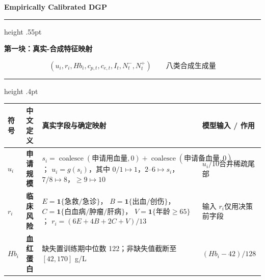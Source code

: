 \documentclass[a4paper,fontset=none]{ctexart}
\newcommand{\pagetitle}[1]{%
  \begin{center}
    {\fontsize{19}{22}\selectfont\bfseries Empirically Calibrated DGP}\par
  \end{center}
  \vspace{4pt}
  \color{rule}\hrule height .55pt\color{ink}
  \vspace{5pt}
  \noindent\colorbox{soft}{%
    \parbox{\dimexpr\linewidth-2\fboxsep\relax}{%
      \fontsize{13}{15}\selectfont\bfseries #1}}
  \vspace{5pt}}
\newcommand{\group}[1]{%
  \vspace{4pt}{\fontsize{11}{13}\selectfont\bfseries #1}\par
  \vspace{1pt}\color{rule}\hrule height .4pt\color{ink}\vspace{3pt}}
\begin{document}
\fontsize{9.4}{11.5}\selectfont

\pagetitle{第一块：真实-合成特征映射}

\[
\boxed{(u_i,r_i,Hb_i,c_{p,t},c_{e,t},I_t,N_t^-,N_t^+)}
\qquad\text{八类合成生成量}
\]

\group{患者特征}
\begin{center}
\fontsize{8.9}{10.7}\selectfont
\setlength{\tabcolsep}{4pt}
\begin{tabularx}{.99\textwidth}{
  >{\centering\arraybackslash}p{15mm}
  >{\raggedright\arraybackslash}p{25mm}
  >{\raggedright\arraybackslash}p{92mm}
  X}
\toprule
符号 & 中文定义 & 真实字段与确定映射 & 模型输入 / 作用\\
\midrule
$u_i$ & \textbf{申请规模} &
$s_i=\operatorname{coalesce}(\text{申请用血量},0)+
\operatorname{coalesce}(\text{申请备血量},0)$；\newline
$u_i=g(s_i)$，其中
$0/1\mapsto1$，$2$--$6\mapsto s_i$，$7/8\mapsto8$，$\ge9\mapsto10$ &
$u_i/10$\newline 合并稀疏尾部\\

$r_i$ & \textbf{临床风险} &
$E=\mathbf1\{\text{急救/急诊}\}$，
$B=\mathbf1\{\text{出血/创伤}\}$，\newline
$C=\mathbf1\{\text{白血病/肿瘤/肝病}\}$，
$V=\mathbf1\{\text{年龄}\ge65\}$；
$r_i=(6E+4B+2C+V)/13$ &
输入 $r_i$\newline 仅用决策前字段\\

$Hb_i$ & \textbf{血红蛋白} &
缺失置训练期中位数 122；非缺失值截断至 $[42,170]$ g/L &
$(Hb_i-42)/128$\\
\bottomrule
\end{tabularx}
\end{center}
\end{document}
